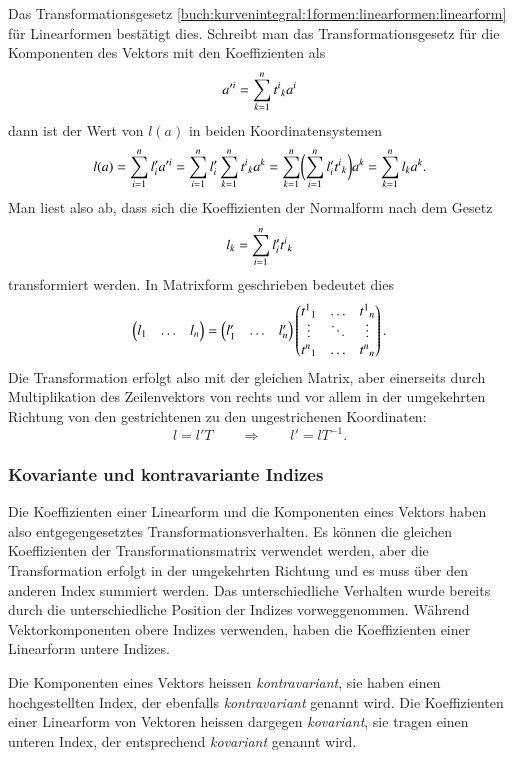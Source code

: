 Das Transformationsgesetz
\eqref{buch:kurvenintegral:1formen:linearformen:linearform}
für Linearformen bestätigt dies.
Schreibt man das Transformationsgesetz für die Komponenten des
Vektors mit den Koeffizienten als
\[
a^{\prime i}
=
\sum_{k=1}^n t^i\mathstrut_k a^i
\]
dann ist der Wert von $l(a)$ in beiden Koordinatensystemen
\[
l(a)
=
\sum_{i=1}^n l'_i a^{\prime i}
=
\sum_{i=1}^n
l'_i
\sum_{k=1}^n
t^i\mathstrut_k a^k
=
\sum_{k=1}^n
\biggl(
\sum_{i=1}^n
l'_i
t^i\mathstrut_k
\biggl)
a^k
=
\sum_{k=1}^n
l_k
a^k.
\]
Man liest also ab, dass sich die Koeffizienten der Normalform
nach dem Gesetz
\[
l_k
=
\sum_{i=1}^n
l'_i
t^i\mathstrut_k
\]
transformiert werden.
In Matrixform geschrieben bedeutet dies
\[
\begin{pmatrix}l_1&\dots&l_n\end{pmatrix}
=
\begin{pmatrix}l_1'&\dots&l_n'\end{pmatrix}
\begin{pmatrix}
t^1\mathstrut_1 & \dots  & t^1\mathstrut_n \\[-3pt]
\vdots          & \ddots & \vdots          \\
t^n\mathstrut_1 & \dots  & t^n\mathstrut_n
\end{pmatrix}.
\]
Die Transformation erfolgt also mit der gleichen Matrix, aber
einerseits durch Multiplikation des Zeilenvektors von rechts
und vor allem in der umgekehrten Richtung von den gestrichtenen
zu den ungestrichenen Koordinaten:
\[
l = l' T
\qquad\Rightarrow\qquad l' = lT^{-1}.
\]

%
%
\subsubsection{Kovariante und kontravariante Indizes}
Die Koeffizienten einer Linearform und die Komponenten eines Vektors 
haben also entgegengesetztes Transformationsverhalten.
Es können die gleichen Koeffizienten der Transformationsmatrix 
verwendet werden, aber die Transformation erfolgt in der umgekehrten
Richtung und es muss über den anderen Index summiert werden.
Das unterschiedliche Verhalten wurde bereits durch die unterschiedliche
Position der Indizes vorweggenommen.
Während Vektorkomponenten obere Indizes verwenden, haben die
Koeffizienten einer Linearform untere Indizes.

\begin{definition}
Die Komponenten eines Vektors heissen \emph{kontravariant}, sie haben
%
einen hochgestellten Index, der ebenfalls \emph{kontravariant} genannt
wird.
Die Koeffizienten einer Linearform von Vektoren heissen dargegen
{\em kovariant}, sie tragen einen unteren Index, der entsprechend
%
{\em kovariant} genannt wird.
\end{definition}

